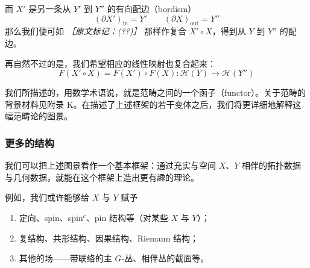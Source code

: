 
而 $X'$ 是另一条从 $Y'$ 到 $Y''$ 的有向配边（bordism）
\begin{equation*}
  (\partial X')_{\mathrm{in}}=Y' \qquad (\partial X)_{\mathrm{out}}=Y''
\end{equation*}
那么我们便可如 {\small\itshape ［原文标记：(??)］} 那样作复合 $X'\circ X$，得到从 $Y$ 到 $Y''$ 的配边。

再自然不过的是，我们希望相应的线性映射也复合起来：
\begin{equation*}
  F(X'\circ X)=F(X')\circ F(X):\mathcal{H}(Y)\to\mathcal{H}(Y'')
\end{equation*}

我们所描述的，用数学术语说，就是范畴之间的一个函子（functor）。关于范畴的背景材料见附录 K。在描述了上述框架的若干变体之后，我们将更详细地解释这幅范畴论的图景。

\subsubsection{更多的结构} %

我们可以把上述图景看作一个基本框架：通过充实与空间 $X$、$Y$ 相伴的拓扑数据与几何数据，就能在这个框架上造出更有趣的理论。

例如，我们或许能够给 $X$ 与 $Y$ 赋予

\begin{enumerate}
  \item 定向、spin、spin$^c$、pin 结构等（对某些 $X$ 与 $Y$）；
  \item 复结构、共形结构、因果结构、Riemann 结构；
  \item 其他的场——带联络的主 $G$-丛、相伴丛的截面等。
\end{enumerate}

